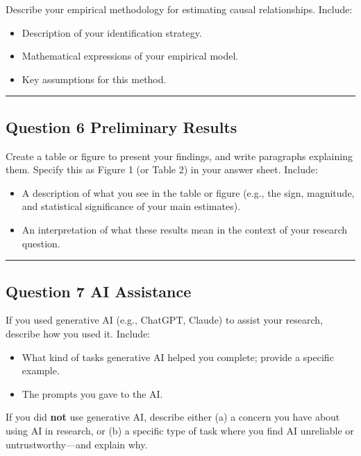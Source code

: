 \documentclass[paper=a4, fontsize=11pt]{scrartcl}
\newcommand{\horrule}[1]{\rule{\linewidth}{#1}}
\begin{document}
Describe your empirical methodology for estimating causal relationships. Include:
\begin{itemize}
  \item Description of your identification strategy.
  \item Mathematical expressions of your empirical model.
  \item Key assumptions for this method.
\end{itemize}

\bigskip\horrule{0.4pt}\bigskip


\subsection*{Question 6 \quad Preliminary Results}
Create a table or figure to present your findings, and write paragraphs explaining them. Specify this as Figure 1 (or Table 2) in your answer sheet. Include:
\begin{itemize}
  \item A description of what you see in the table or figure (e.g., the sign, magnitude, and statistical significance of your main estimates).
  \item An interpretation of what these results mean in the context of your research question.
\end{itemize}


\bigskip\horrule{0.4pt}\bigskip



\subsection*{Question 7 \quad AI Assistance}
If you used generative AI (e.g., ChatGPT, Claude) to assist your research, describe how you used it. Include:
\begin{itemize}
  \item What kind of tasks generative AI helped you complete; provide a specific example.
  \item The prompts you gave to the AI.
\end{itemize}
If you did \textbf{not} use generative AI, describe either (a) a concern you have about using AI in research, or (b) a specific type of task where you find AI unreliable or untrustworthy—and explain why.
\end{document}
